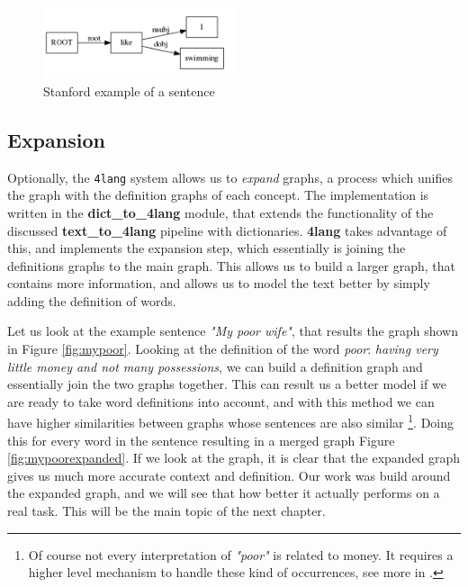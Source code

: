 \begin{figure}[h]
	\centering
	\includegraphics[width=0.5\textwidth]{figures/swimmingdep}
	\caption{Stanford example of a sentence}
	\label{fig:swimmingdep}
\end{figure}


\subsection{Expansion}
Optionally, the \texttt{4lang} system allows us to \textit{expand}
graphs, a process which unifies the graph with the definition graphs of
each concept. The implementation is written in the \textbf{dict\_to\_4lang} module, that extends the functionality of the discussed \textbf{text\_to\_4lang} pipeline with dictionaries. \textbf{4lang} takes advantage of this, and implements the expansion step, which essentially is joining the definitions graphs to the main graph. This allows us to build a larger graph, that contains more information, and allows us to model the text better by simply adding the definition of words.

Let us look at the example sentence \textit{"My poor wife"}, that results the graph shown in Figure \ref{fig:mypoor}. Looking at the definition of the word \textit{poor}: \textit{having very little money and not many possessions}, we can build a definition graph and essentially join the two graphs together. This can result us a better model if we are ready to take word definitions into account, and with this method we can have higher similarities between graphs whose sentences are also similar \footnote{Of course not every interpretation of \textit{"poor"} is related to money. It requires a higher level mechanism to handle these kind of occurrences, see more in \cite{Kornai:2018}.}. Doing this for every word in the sentence resulting in a merged graph Figure \ref{fig:mypoorexpanded}. If we look at the graph, it is clear that the expanded graph gives us much more accurate context and definition. Our work was build around the expanded graph, and we will see that how better it actually performs on a real task. This will be the main topic of the next chapter.

